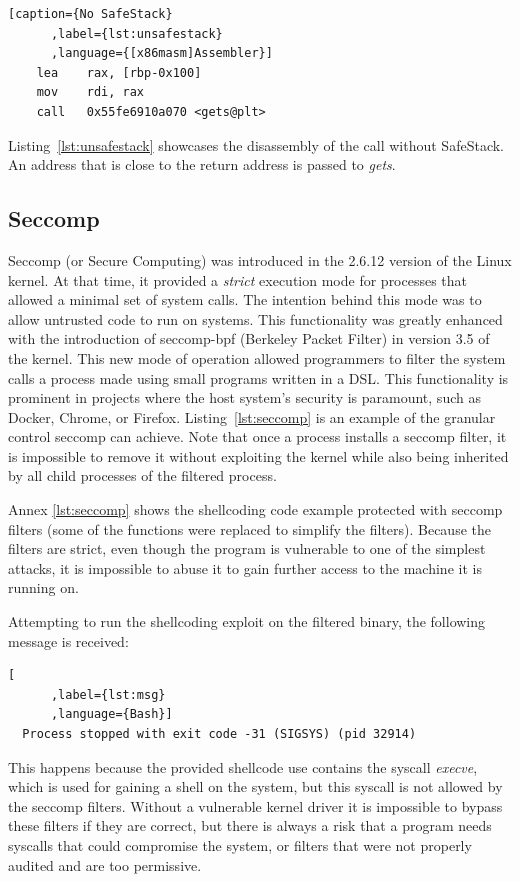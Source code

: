 \documentclass{article}
\begin{document}
\begin{lstlisting}[caption={No SafeStack}
      ,label={lst:unsafestack}
      ,language={[x86masm]Assembler}]
    lea    rax, [rbp-0x100]
    mov    rdi, rax
    call   0x55fe6910a070 <gets@plt>
\end{lstlisting}

Listing~\ref{lst:unsafestack} showcases the disassembly of the call without SafeStack. An address that is close to the return address is passed to \emph{gets}.

\subsection{Seccomp}
Seccomp (or Secure Computing) was introduced in the 2.6.12 version of the Linux kernel. At that time, it provided a \emph{strict} execution mode for processes that allowed a minimal set of system calls. The intention behind this mode was to allow untrusted code to run on systems. This functionality was greatly enhanced with the introduction of seccomp-bpf (Berkeley Packet Filter) in version 3.5 of the kernel. This new mode of operation allowed programmers to filter the system calls a process made using small programs written in a DSL. This functionality is prominent in projects where the host system's security is paramount, such as Docker, Chrome, or Firefox. Listing~\ref{lst:seccomp} is an example of the granular control seccomp can achieve. Note that once a process installs a seccomp filter, it is impossible to remove it without exploiting the kernel while also being inherited by all child processes of the filtered process.

Annex \ref{lst:seccomp} shows the shellcoding code example protected with seccomp filters (some of the functions were replaced to simplify the filters). Because the filters are strict, even though the program is vulnerable to one of the simplest attacks, it is impossible to abuse it to gain further access to the machine it is running on.

Attempting to run the shellcoding exploit on the filtered binary, the following message is received:
\begin{lstlisting}[
      ,label={lst:msg}
      ,language={Bash}]
  Process stopped with exit code -31 (SIGSYS) (pid 32914)
\end{lstlisting}

This happens because the provided shellcode use contains the syscall \emph{execve}, which is used for gaining a shell on the system, but this syscall is not allowed by the seccomp filters. Without a vulnerable kernel driver it is impossible to bypass these filters if they are correct, but there is always a risk that a program needs syscalls that could compromise the system, or filters that were not properly audited and are too permissive.
\end{document}
